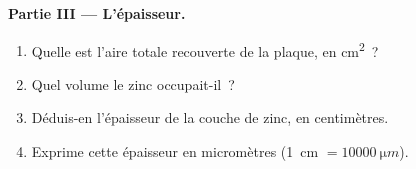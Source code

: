 \begin{problem}
\medskip
\noindent\textbf{Partie III --- L'épaisseur.}
\begin{enumerate}[resume]
  \item Quelle est l'aire totale recouverte de la plaque, en
        \unit{cm^2}~?
  \item Quel volume le zinc occupait-il~?
  \item Déduis-en l'épaisseur de la couche de zinc, en centimètres.
  \item Exprime cette épaisseur en micromètres
        (\qty{1}{cm} $= \qty{10000}{\micro m}$).
\end{enumerate}
\end{problem}
